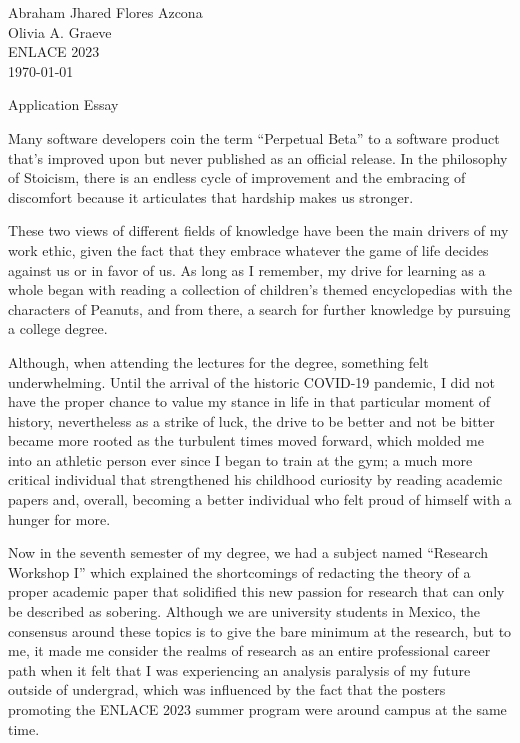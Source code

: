 \raggedright

	Abraham Jhared Flores Azcona \\ Olivia A. Graeve \\ ENLACE 2023 \\ \today

	\centerline{Application Essay}

\setlength{\parindent}{.5in}



Many software developers coin the term ``Perpetual Beta'' to a
software product that's improved upon but never published as
an official release. In the philosophy of Stoicism, there is an 
endless cycle of improvement and the embracing of discomfort because
it articulates that hardship makes us stronger.

These two views of different fields of knowledge have been the main
drivers of my work ethic, given the fact that they embrace whatever
the game of life decides against us or in favor of us.
As long as I remember, my drive for learning as a whole began with
reading a collection of children's themed encyclopedias with the
characters of Peanuts, and from there, a search for further 
knowledge by pursuing a college degree.

Although, when attending the lectures for the degree,
something felt underwhelming. Until the arrival of the
historic COVID-19 pandemic, I did not have the proper chance to value
my stance in life in that particular moment of history, nevertheless
as a strike of luck, the drive to be better and not be bitter became
more rooted as the turbulent times moved forward, which molded me into
an athletic person ever since I began to train at the gym; a much more 
critical individual that strengthened his childhood curiosity by reading 
academic papers and, overall, becoming a better individual who felt 
proud of himself with a hunger for more.

Now in the seventh semester of my degree, we had a subject named
``Research Workshop I'' which explained the shortcomings of
redacting the theory of a proper academic paper
that solidified this new passion for research that can only
be described as sobering. Although we are university students
in Mexico, the consensus around these topics is to give the bare
minimum at the research, but to me, it made me consider the realms of
research as an entire professional career path when it felt that I 
was experiencing an analysis paralysis of my future outside of undergrad, 
which was influenced by the fact that the posters promoting the ENLACE 2023 
summer program were around campus at the same time.

